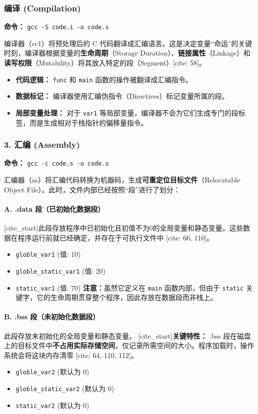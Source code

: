 \subsubsection{编译 (Compilation)}
\textbf{命令：} \texttt{gcc -S code.i -o code.s}

编译器（cc1）将预处理后的 C 代码翻译成汇编语言。这是决定变量“命运”的关键时刻，编译器根据变量的\textbf{生命周期}（Storage Duration）、\textbf{链接属性}（Linkage）和\textbf{读写权限}（Mutability）将其放入特定的段（Segment）[cite: 58]。
\begin{itemize}
    \item \textbf{代码逻辑：} \texttt{func} 和 \texttt{main} 函数的操作被翻译成汇编指令。
    \item \textbf{数据标记：} 编译器使用汇编伪指令（Directives）标记变量所属的段。
    \item \textbf{局部变量处理：} 对于 \texttt{var1} 等局部变量，编译器不会为它们生成专门的段标签，而是生成相对于栈指针的偏移量指令。
\end{itemize}

\subsubsection{3. 汇编 (Assembly)}
\textbf{命令：} \texttt{gcc -c code.s -o code.o}

汇编器（as）将汇编代码转换为机器码，生成\textbf{可重定位目标文件}（Relocatable Object File）。此时，文件内部已经按照“段”进行了划分：

\paragraph{A. .data 段（已初始化数据段）}
[cite\_start]此段存放程序中已初始化且初值不为0的全局变量和静态变量。这些数据在程序运行前就已经确定，并存在于可执行文件中 [cite: 66, 110]。
\begin{itemize}
    \item \texttt{globle\_var1} (值: 10)
    \item \texttt{globle\_static\_var1} (值: 20)
    \item \texttt{static\_var1} (值: 70) \textbf{注意：}虽然它定义在 \texttt{main} 函数内部，但由于 \texttt{static} 关键字，它的生命周期贯穿整个程序，因此存放在数据段而非栈上。
\end{itemize}

\paragraph{B. .bss 段（未初始化数据段）}
此段存放未初始化的全局变量和静态变量。
[cite\_start]\textbf{关键特性：} .bss 段在磁盘上的目标文件中\textbf{不占用实际存储空间}，仅记录所需空间的大小。程序加载时，操作系统会将这块内存清零 [cite: 64, 110, 112]。
\begin{itemize}
    \item \texttt{globle\_var2} (默认为 0)
    \item \texttt{globle\_static\_var2} (默认为 0)
    \item \texttt{static\_var2} (默认为 0)
\end{itemize}

